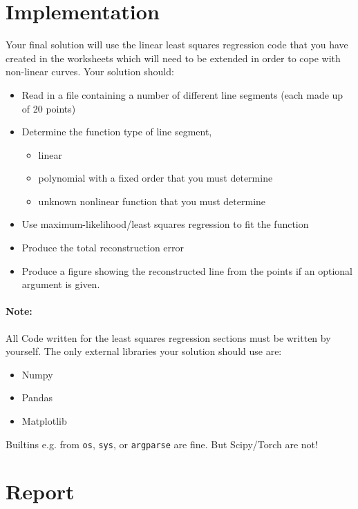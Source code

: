 \documentclass[10pt]{article}
\begin{document}
\section{Implementation}
\label{sec:implementation}
Your final solution will use the linear least squares regression code that you have created in the worksheets which will need to be extended in order to cope with non-linear curves.
Your solution should:
\begin{itemize}
  \item Read in a file containing a number of different line segments (each made up of 20 points)
  \item Determine the function type of line segment, 
  \begin{itemize}
    \item linear
    \item polynomial with a fixed order that you must determine
    \item unknown nonlinear function that you must determine
  \end{itemize}
  \item Use maximum-likelihood/least squares regression to fit the function
  \item Produce the total reconstruction error 
  \item Produce a figure showing the reconstructed line from the points if an optional argument is given. 
\end{itemize}

\paragraph{Note:} All Code written for the least squares regression sections must be written by yourself.
The only external libraries your solution should use are:
\begin{itemize}
  \item Numpy
  \item Pandas
  \item Matplotlib
\end{itemize}
Builtins e.g. from \texttt{os}, \texttt{sys}, or \texttt{argparse} are fine.  But Scipy/Torch are not!

\section{Report}
\end{document}
